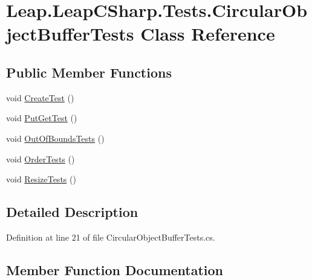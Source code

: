 \hypertarget{class_leap_1_1_leap_c_sharp_1_1_tests_1_1_circular_object_buffer_tests}{}\section{Leap.\+Leap\+C\+Sharp.\+Tests.\+Circular\+Object\+Buffer\+Tests Class Reference}
\label{class_leap_1_1_leap_c_sharp_1_1_tests_1_1_circular_object_buffer_tests}
\subsection*{Public Member Functions}
\begin{DoxyCompactItemize}
\item 
void \mbox{\hyperlink{class_leap_1_1_leap_c_sharp_1_1_tests_1_1_circular_object_buffer_tests_a0a4248865999053d090adeae5e5f3ef3}{Create\+Test}} ()
\item 
void \mbox{\hyperlink{class_leap_1_1_leap_c_sharp_1_1_tests_1_1_circular_object_buffer_tests_af0dc9dbcd071c5ec27027637c7889af1}{Put\+Get\+Test}} ()
\item 
void \mbox{\hyperlink{class_leap_1_1_leap_c_sharp_1_1_tests_1_1_circular_object_buffer_tests_a30b19aa15c293a086e154b0f50cf6603}{Out\+Of\+Bounds\+Tests}} ()
\item 
void \mbox{\hyperlink{class_leap_1_1_leap_c_sharp_1_1_tests_1_1_circular_object_buffer_tests_a254416b11cf75a060289dd8fbd112c3a}{Order\+Tests}} ()
\item 
void \mbox{\hyperlink{class_leap_1_1_leap_c_sharp_1_1_tests_1_1_circular_object_buffer_tests_a8848cce0f507da8c50da295bedfae991}{Resize\+Tests}} ()
\end{DoxyCompactItemize}


\subsection{Detailed Description}


Definition at line 21 of file Circular\+Object\+Buffer\+Tests.\+cs.



\subsection{Member Function Documentation}
\mbox{\label{class_leap_1_1_leap_c_sharp_1_1_tests_1_1_circular_object_buffer_tests_a0a4248865999053d090adeae5e5f3ef3}} 

